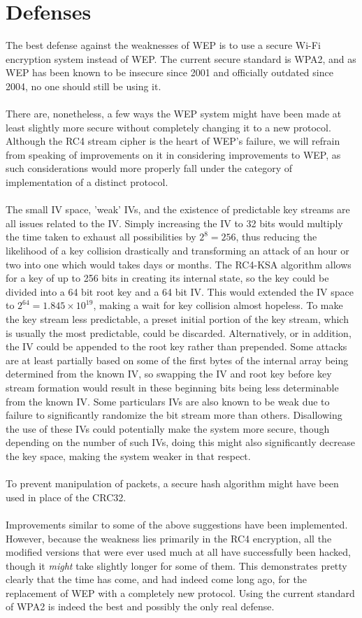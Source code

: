 \documentclass[12pt]{article}
\begin{document}
\section{Defenses}
\label{sec:def}
The best defense against the weaknesses of WEP is to use a secure Wi-Fi encryption system instead of WEP.  The current secure standard is WPA2, and as WEP has been known to be insecure since 2001 and officially outdated since 2004, no one should still be using it.
\\\\
There are, nonetheless, a few ways the WEP system might have been made at least slightly more secure without completely changing it to a new protocol.  Although the RC4 stream cipher is the heart of WEP's failure, we will refrain from speaking of improvements on it in considering improvements to WEP, as such considerations would more properly fall under the category of implementation of a distinct protocol.
\\\\
The small IV space, 'weak' IVs, and the existence of predictable key streams are all issues related to the IV.  Simply increasing the IV to 32 bits would multiply the time taken to exhaust all possibilities by $2^8=256$, thus reducing the likelihood of a key collision drastically and transforming an attack of an hour or two into one which would takes days or months.  The RC4-KSA algorithm allows for a key of up to 256 bits in creating its internal state, so the key could be divided into a 64 bit root key and a 64 bit IV.  This would extended the IV space to $2^{64}=1.845\times 10^{19}$, making a wait for key collision almost hopeless.  To make the key stream less predictable, a preset initial portion of the key stream, which is usually the most predictable, could be discarded.  Alternatively, or in addition, the IV could be appended to the root key rather than prepended.  Some attacks are at least partially based on some of the first bytes of the internal array being determined from the known IV, so swapping the IV and root key before key stream formation would result in these beginning bits being less determinable from the known IV.  Some particulars IVs are also known to be weak due to failure to significantly randomize the bit stream more than others.  Disallowing the use of these IVs could potentially make the system more secure, though depending on the number of such IVs, doing this might also significantly decrease the key space, making the system weaker in that respect.
\\\\
To prevent manipulation of packets, a secure hash algorithm might have been used in place of the CRC32.
\\\\
Improvements similar to some of the above suggestions have been implemented.  However, because the weakness lies primarily in the RC4 encryption, all the modified versions that were ever used much at all have successfully been hacked, though it \textit{might} take slightly longer for some of them.  This demonstrates pretty clearly that the time has come, and had indeed come long ago, for the replacement of WEP with a completely new protocol.  Using the current standard of WPA2 is indeed the best and possibly the only real defense.
\end{document}
